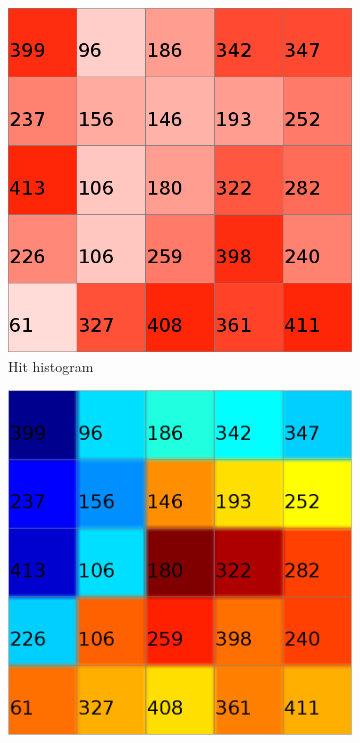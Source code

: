 \documentclass{acm_proc_article-sp}
\begin{document}
\begin{figure}
\centering
\begin{subfigure}[b]{0.45\linewidth}
    \includegraphics[width=\linewidth]{img/wine-small-hit-histogram}
    \caption{Hit histogram}
    \label{fig:wine-small-hit-histogram}
\end{subfigure}
\begin{subfigure}[b]{0.45\linewidth}
    \includegraphics[width=\linewidth]{img/wine-small-p-matrix}

\end{subfigure}
\end{figure}
\end{document}
